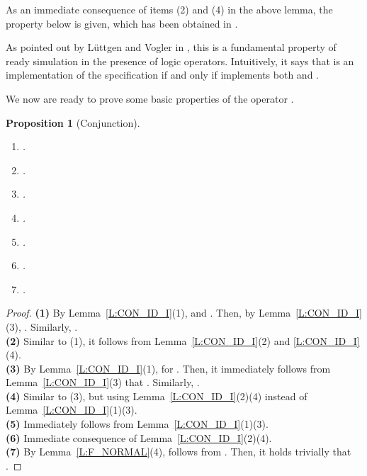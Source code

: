 \documentclass{elsarticle}
\theoremstyle{plain}
\newtheorem{proposition}[theorem]{Proposition}
\theoremstyle{definition}
\begin{document}
As an immediate consequence of items (2) and (4) in the above lemma, the property below is given, which has been obtained in \cite{Luttgen10}.


As pointed out by L\"{u}ttgen and Vogler in \cite{Luttgen07,Luttgen10}, this is a fundamental property of ready simulation in the presence of logic operators. Intuitively, it says that  is an implementation  of the specification  if and only if  implements both  and .

We now are ready to prove some basic properties of the operator .

\begin{proposition}[Conjunction]\label{S:CONJUNCTION}\hfill
    \begin{enumerate}
      \item .
      \item .
      \item .
      \item .
      \item .
      \item .
      \item .
    \end{enumerate}
\end{proposition}
\begin{proof}
  \noindent \textbf{(1)} By Lemma~\ref{L:CON_ID_I}(1),  and .
  Then, by Lemma~\ref{L:CON_ID_I}(3), . Similarly, .\\

\noindent \textbf{(2)} Similar to (1), it follows from Lemma~\ref{L:CON_ID_I}(2) and \ref{L:CON_ID_I}(4).\\

\noindent \textbf{(3)} By Lemma~\ref{L:CON_ID_I}(1),  for .
Then, it immediately follows from Lemma~\ref{L:CON_ID_I}(3) that .
Similarly, . \\

\noindent \textbf{(4)}
Similar to (3), but using Lemma~\ref{L:CON_ID_I}(2)(4) instead of Lemma~\ref{L:CON_ID_I}(1)(3).\\

\noindent \textbf{(5)} Immediately follows from Lemma~\ref{L:CON_ID_I}(1)(3).\\

\noindent \textbf{(6)} Immediate consequence of Lemma~\ref{L:CON_ID_I}(2)(4).\\

\noindent \textbf{(7)} By Lemma~\ref{L:F_NORMAL}(4),  follows from . Then, it holds trivially that .
\end{proof}
\end{document}
